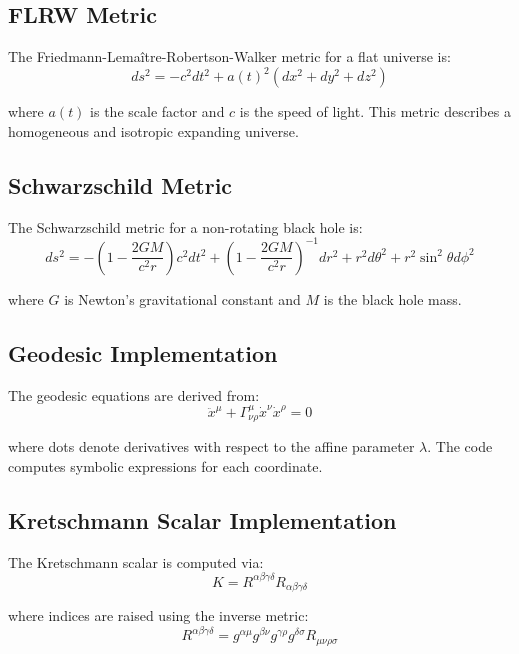 \documentclass[11pt,a4paper]{article}
\begin{document}
\subsection{FLRW Metric}

The Friedmann-Lema\^{i}tre-Robertson-Walker metric for a flat universe is:
\begin{equation}
ds^2 = -c^2 dt^2 + a(t)^2 (dx^2 + dy^2 + dz^2)
\end{equation}

where $a(t)$ is the scale factor and $c$ is the speed of light. This metric describes a homogeneous and isotropic expanding universe.

\subsection{Schwarzschild Metric}

The Schwarzschild metric for a non-rotating black hole is:
\begin{equation}
ds^2 = -\left(1-\frac{2GM}{c^2 r}\right) c^2 dt^2 + \left(1-\frac{2GM}{c^2 r}\right)^{-1} dr^2 + r^2 d\theta^2 + r^2 \sin^2\theta d\phi^2
\end{equation}

where $G$ is Newton's gravitational constant and $M$ is the black hole mass.

\subsection{Geodesic Implementation}

The geodesic equations are derived from:
\begin{equation}
\ddot{x}^\mu + \Gamma^{\mu}_{\nu\rho} \dot{x}^\nu \dot{x}^\rho = 0
\end{equation}

where dots denote derivatives with respect to the affine parameter $\lambda$. The code computes symbolic expressions for each coordinate.

\subsection{Kretschmann Scalar Implementation}\label{sec:kretschmann}

The Kretschmann scalar is computed via:
\begin{equation}
K = R^{\alpha\beta\gamma\delta} R_{\alpha\beta\gamma\delta}
\end{equation}

where indices are raised using the inverse metric:
\begin{equation}
R^{\alpha\beta\gamma\delta} = g^{\alpha\mu} g^{\beta\nu} g^{\gamma\rho} g^{\delta\sigma} R_{\mu\nu\rho\sigma}
\end{equation}
\end{document}
